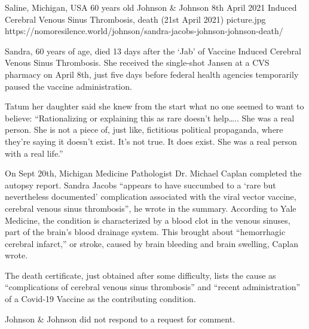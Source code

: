 {Saline, Michigan, USA}
{60 years old}
{Johnson \& Johnson }
{8th April 2021}
{Induced Cerebral Venous Sinus Thrombosis, death (21st April 2021)}
{picture.jpg}
{https://nomoresilence.world/johnson/sandra-jacobs-johnson-johnson-death/}
{

Sandra, 60 years of age, died 13 days after the ‘Jab’ of Vaccine Induced
Cerebral Venous Sinus Thrombosis. She received the single-shot Jansen at a CVS
pharmacy on April 8th, just five days before federal health agencies temporarily
paused the vaccine administration.

Tatum her daughter said she knew from the start what no one seemed to want to
believe: “Rationalizing or explaining this as rare doesn’t help….. She was a
real person. She is not a piece of, just like, fictitious political propaganda,
where they’re saying it doesn’t exist. It’s not true. It does exist. She was a
real person with a real life.”

On Sept 20th, Michigan Medicine Pathologist Dr. Michael Caplan completed the
autopsy report. Sandra Jacobs “appears to have succumbed to a ‘rare but
nevertheless documented’ complication associated with the viral vector vaccine,
cerebral venous sinus thrombosis”, he wrote in the summary. According to Yale
Medicine, the condition is characterized by a blood clot in the venous sinuses,
part of the brain’s blood drainage system. This brought about “hemorrhagic
cerebral infarct,” or stroke, caused by brain bleeding and brain swelling,
Caplan wrote.

The death certificate, just obtained after some difficulty, lists the cause as
“complications of cerebral venous sinus thrombosis” and “recent administration”
of a Covid-19 Vaccine as the contributing condition.

Johnson \& Johnson did not respond to a request for comment.

}
